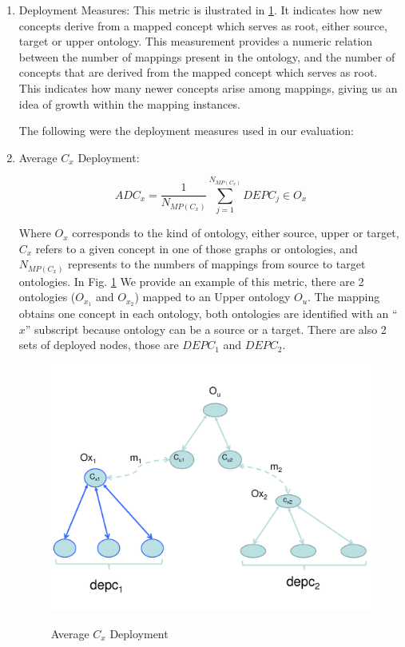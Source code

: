 \begin{enumerate}
	\item Deployment Measures:
	This metric is ilustrated in \ref{figure4-12}. It indicates how new concepts derive from a mapped concept   which serves as root, either source, target or upper ontology. This measurement provides a numeric relation between the number of mappings present in the ontology, and the number of concepts that are derived from the mapped concept which serves as root. This indicates how many newer concepts arise among mappings, giving us an idea of growth within the mapping instances. 
	
	The following were the deployment measures used in our evaluation:
	
	\item Average $C_{x}$ Deployment:
	
	
	\begin{equation}\label{eq.4.5}
		ADC_{x} = \frac{1}{N_{MP(C_{x})}} \sum_{j=1}^{N_{MP(C_{x})}} DEPC_{j} \in O_{x}
	\end{equation}
	
	Where $O_{x}$ corresponds to the kind of ontology, either source, upper or target, $C_{x}$ refers to a given concept in one of those graphs or ontologies, and ${N_{MP(C_{x})}}$ represents to the numbers of mappings from source to target ontologies. In  Fig. \ref{figure4-12} We provide an example of this metric, there are 2 ontologies ($O_{x_{1}}$ and $O_{x_{2}}$)  mapped to an Upper ontology $O_{u}$. The mapping obtains one concept in each ontology, both ontologies are identified with an “$x$” subscript because ontology can be a source or a target. There are also 2 sets of deployed nodes, those are $DEPC_{1}$ and $DEPC_{2}$.
	
	
	
	\begin{figure}
		\begin{center}
			\includegraphics[scale=0.6, angle=90]{figure-chapterIV/fig4-12.pdf}\\
			\caption{Average $C_{x}$ Deployment}
			\label{figure4-12}
		\end{center}
	\end{figure}
	

\end{enumerate}
